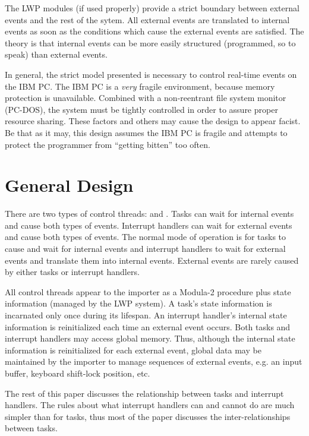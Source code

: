 The LWP modules (if used properly) provide a strict boundary between
external events and the rest of the sytem.  All external
events are translated to internal events as soon as the conditions
which cause the external events are satisfied.
The theory is that internal events
can be more easily structured (programmed, so to speak) than external events.

In general, the strict model presented is necessary to control real-time
events on the IBM PC.  The IBM PC is a {\em very} fragile environment, 
because memory protection is unavailable.  Combined with a non-reentrant
file system monitor (PC-DOS), the system must be tightly controlled in
order to assure proper resource sharing.  These factors and others 
may cause the design to appear facist.  Be that as it may, this design
assumes the IBM PC is fragile and attempts to protect the programmer
from ``getting bitten'' too often.

\section{General Design}
There are two types of control threads:  and 
.  
Tasks can wait for internal events and cause both types of
events.  Interrupt handlers can wait for external events and cause both
types of events.  The normal mode of operation is for tasks to cause
and wait for internal events and interrupt handlers to wait for external
events and translate them into internal events.  External events are
rarely caused by either tasks or interrupt handlers.

All control threads appear to the importer as a Modula-2 procedure
plus state information (managed by the LWP system).  A task's state information
is incarnated only once during its lifespan.  An interrupt handler's 
internal state information is reinitialized each time an external 
event occurs.  Both tasks and interrupt handlers may access global memory.
Thus, although the internal state information is reinitialized for each
external event, global data may be maintained by the importer to manage
sequences of external events, e.g. an input buffer,
keyboard shift-lock position, etc.

The rest of this paper discusses the relationship between tasks and
interrupt handlers.  The rules about what interrupt handlers can and
cannot do are much simpler than for tasks, thus most of the paper
discusses the inter-relationships between tasks.


